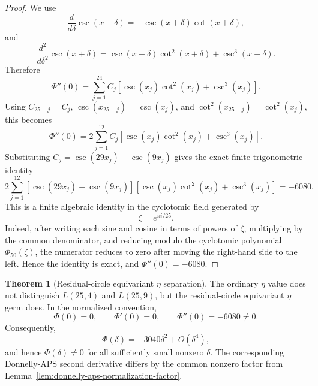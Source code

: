 \documentclass{article}
\theoremstyle{definition}
\newtheorem{theorem}{Theorem}[section]
\numberwithin{equation}{section}
\begin{document}
\begin{proof}
We use
\begin{equation}
\frac{d}{d\delta}\csc(x+\delta)
=
-\csc(x+\delta)\cot(x+\delta),
\end{equation}
and
\begin{equation}
\frac{d^2}{d\delta^2}\csc(x+\delta)
=
\csc(x+\delta)\cot^2(x+\delta)
+
\csc^3(x+\delta).
\end{equation}
Therefore
\begin{equation}
\Phi''(0)
=
\sum_{j=1}^{24}
C_j
\left[
\csc(x_j)\cot^2(x_j)
+
\csc^3(x_j)
\right].
\end{equation}
Using $C_{25-j}=C_j$, $\csc(x_{25-j})=\csc(x_j)$, and $\cot^2(x_{25-j})=\cot^2(x_j)$, this becomes
\begin{equation}
\Phi''(0)
=
2\sum_{j=1}^{12}
C_j
\left[
\csc(x_j)\cot^2(x_j)
+
\csc^3(x_j)
\right].
\end{equation}
Substituting $C_j=\csc(29x_j)-\csc(9x_j)$ gives the exact finite trigonometric identity
\begin{equation}
2\sum_{j=1}^{12}
\left[
\csc(29x_j)-\csc(9x_j)
\right]
\left[
\csc(x_j)\cot^2(x_j)
+
\csc^3(x_j)
\right]
=
-6080.
\end{equation}
This is a finite algebraic identity in the cyclotomic field generated by
\begin{equation}
\zeta=e^{\pi i/25}.
\end{equation}
Indeed, after writing each sine and cosine in terms of powers of $\zeta$, multiplying by the common denominator, and reducing modulo the cyclotomic polynomial $\Phi_{50}(\zeta)$, the numerator reduces to zero after moving the right-hand side to the left.  Hence the identity is exact, and $\Phi''(0)=-6080$.
\end{proof}

\begin{theorem}[Residual-circle equivariant $\eta$ separation]
\label{thm:L25-residual-circle-eta-separation}
The ordinary $\eta$ value does not distinguish $L(25,4)$ and $L(25,9)$, but the residual-circle equivariant $\eta$ germ does.  In the normalized convention,
\begin{equation}
\Phi(0)=0,
\qquad
\Phi'(0)=0,
\qquad
\Phi''(0)=-6080\neq 0.
\end{equation}
Consequently,
\begin{equation}
\Phi(\delta)
=
-3040\delta^2+O(\delta^4),
\end{equation}
and hence $\Phi(\delta)\neq 0$ for all sufficiently small nonzero $\delta$.  The corresponding Donnelly-APS second derivative differs by the common nonzero factor from Lemma~\ref{lem:donnelly-aps-normalization-factor}.
\end{theorem}
\end{document}
